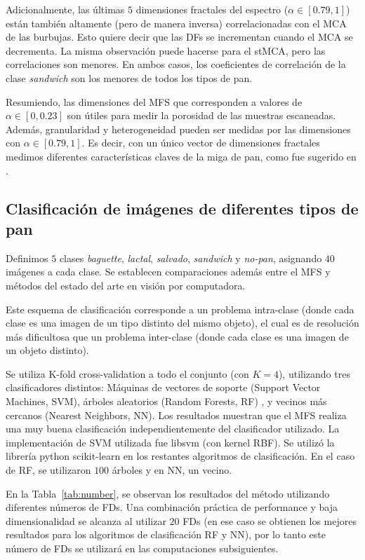 Adicionalmente, las últimas $5$ dimensiones fractales  del espectro ($\alpha \in [0.79,1]$) están también altamente (pero de manera inversa) correlacionadas con el MCA de las burbujas. Esto quiere decir que las DFs se incrementan cuando el MCA se decrementa. La misma observación puede hacerse para el stMCA, pero las correlaciones son menores. En ambos casos, los coeficientes de correlación de la clase {\em sandwich} son los menores de todos los tipos de pan.

Resumiendo, las dimensiones del MFS que corresponden a valores de  $\alpha \in [0,0.23]$ son útiles para medir la porosidad de las muestras escaneadas. Además, granularidad y heterogeneidad pueden ser medidas por las dimensiones con  $\alpha \in [0.79,1]$. Es decir, con un único vector de dimensiones fractales medimos diferentes características claves de la miga de pan, como fue sugerido en \cite{Gonzales2008}.

\subsection{Clasificaci\'on de imágenes de diferentes tipos de pan}

Definimos $5$ clases {\em baguette}, {\em lactal}, {\em salvado}, {\em sandwich} y {\em no-pan}, asignando $40$ imágenes a cada clase.  Se establecen comparaciones además entre el MFS y métodos del estado del arte en visión por computadora.

Este esquema de clasificación corresponde a un problema intra-clase (donde cada clase es una imagen de un tipo distinto del mismo objeto), el cual es de resolución más dificultosa que un problema inter-clase (donde cada clase es una imagen de un objeto distinto).

Se utiliza K-fold cross-validation a todo el conjunto (con $K=4$), utilizando tres clasificadores distintos: Máquinas de vectores de soporte (Support Vector Machines, SVM),  árboles aleatorios (Random Forests, RF) \cite{Breiman2001}, y vecinos más cercanos (Nearest Neighbors, NN).
Los resultados muestran que el MFS realiza una muy buena clasificación independientemente del clasificador utilizado.
La implementación de SVM utilizada fue \textsf{libsvm} \cite{Chang2011} (con kernel RBF).
Se utilizó la librería python \textsf{scikit-learn} en los restantes algoritmos de clasificación.
En el caso de RF, se utilizaron $100$ árboles y en NN, un vecino.

En la Tabla~\ref{tab:number}, se observan los resultados del método utilizando diferentes números de FDs.
Una combinación práctica de performance y baja dimensionalidad se alcanza al utilizar $20$ FDs (en ese caso se obtienen los mejores resultados para los algoritmos de clasificación RF y NN), por lo tanto este número de FDs se utilizará en las computaciones subsiguientes.


